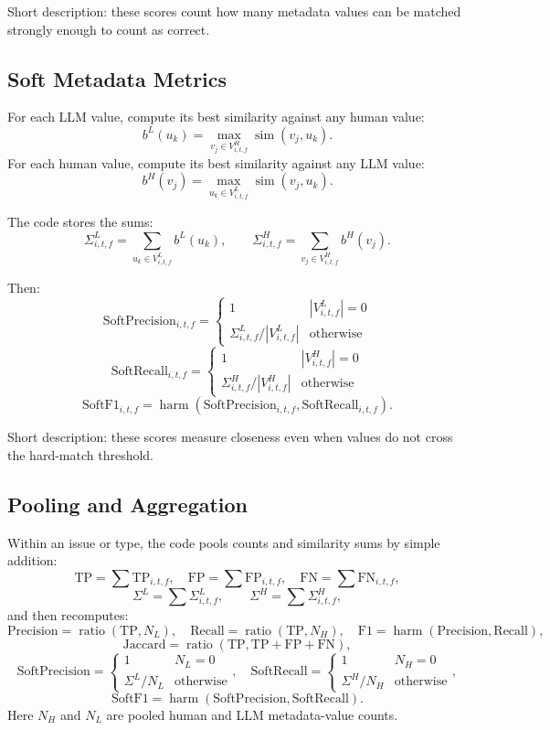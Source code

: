 \documentclass[11pt]{article}
\begin{document}
Short description: these scores count how many metadata values can be matched strongly enough to count as correct.

\subsection{Soft Metadata Metrics}
For each LLM value, compute its best similarity against any human value:
\[
b^{L}(u_k)=\max_{v_j \in V_{i,t,f}^{H}} \operatorname{sim}(v_j,u_k).
\]
For each human value, compute its best similarity against any LLM value:
\[
b^{H}(v_j)=\max_{u_k \in V_{i,t,f}^{L}} \operatorname{sim}(v_j,u_k).
\]

The code stores the sums:
\[
\Sigma^{L}_{i,t,f}=\sum_{u_k \in V_{i,t,f}^{L}} b^{L}(u_k),
\qquad
\Sigma^{H}_{i,t,f}=\sum_{v_j \in V_{i,t,f}^{H}} b^{H}(v_j).
\]

Then:
\[
\mathrm{SoftPrecision}_{i,t,f}=
\begin{cases}
1 & |V_{i,t,f}^{L}|=0\\
\Sigma^{L}_{i,t,f}/|V_{i,t,f}^{L}| & \text{otherwise}
\end{cases}
\]
\[
\mathrm{SoftRecall}_{i,t,f}=
\begin{cases}
1 & |V_{i,t,f}^{H}|=0\\
\Sigma^{H}_{i,t,f}/|V_{i,t,f}^{H}| & \text{otherwise}
\end{cases}
\]
\[
\mathrm{SoftF1}_{i,t,f}=\operatorname{harm}(\mathrm{SoftPrecision}_{i,t,f},\mathrm{SoftRecall}_{i,t,f}).
\]

Short description: these scores measure closeness even when values do not cross the hard-match threshold.

\subsection{Pooling and Aggregation}
Within an issue or type, the code pools counts and similarity sums by simple addition:
\[
\mathrm{TP}=\sum \mathrm{TP}_{i,t,f},\quad
\mathrm{FP}=\sum \mathrm{FP}_{i,t,f},\quad
\mathrm{FN}=\sum \mathrm{FN}_{i,t,f},
\]
\[
\Sigma^L=\sum \Sigma^L_{i,t,f},\qquad \Sigma^H=\sum \Sigma^H_{i,t,f},
\]
and then recomputes:
\[
\mathrm{Precision}=\operatorname{ratio}(\mathrm{TP},N_L),\quad
\mathrm{Recall}=\operatorname{ratio}(\mathrm{TP},N_H),\quad
\mathrm{F1}=\operatorname{harm}(\mathrm{Precision},\mathrm{Recall}),
\]
\[
\mathrm{Jaccard}=\operatorname{ratio}(\mathrm{TP},\mathrm{TP}+\mathrm{FP}+\mathrm{FN}),
\]
\[
\mathrm{SoftPrecision}=
\begin{cases}
1 & N_L=0\\
\Sigma^L/N_L & \text{otherwise}
\end{cases},
\quad
\mathrm{SoftRecall}=
\begin{cases}
1 & N_H=0\\
\Sigma^H/N_H & \text{otherwise}
\end{cases},
\]
\[
\mathrm{SoftF1}=\operatorname{harm}(\mathrm{SoftPrecision},\mathrm{SoftRecall}).
\]
Here $N_H$ and $N_L$ are pooled human and LLM metadata-value counts.
\end{document}
